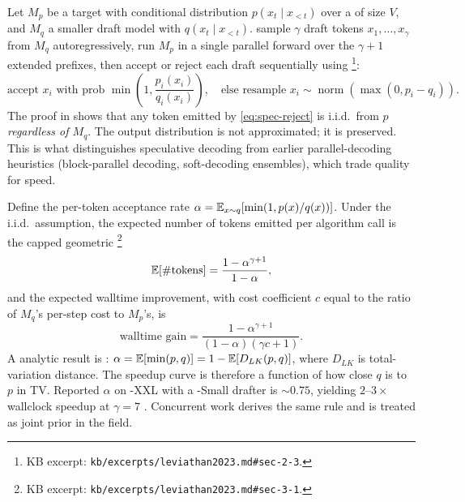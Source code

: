 Let $M_p$ be a target  with conditional distribution $p(x_t \mid
x_{<t})$ over a  of size $V$, and $M_q$ a smaller draft
model with $q(x_t \mid x_{<t})$. \citet{leviathan2023} sample $\gamma$
draft tokens $x_1, \ldots, x_\gamma$ from $M_q$ autoregressively, run
$M_p$ in a single parallel forward over the $\gamma + 1$ extended
prefixes, then accept or reject each draft sequentially using
\citep[\S 2.3]{leviathan2023}\footnote{KB excerpt:
\texttt{kb/excerpts/leviathan2023.md\#sec-2-3}.}:
\begin{equation}
\text{accept } x_i \text{ with prob } \min\!\left(1, \frac{p_i(x_i)}{q_i(x_i)}\right),
\quad \text{else resample } x_i \sim \operatorname{norm}(\max(0, p_i - q_i)).
\label{eq:spec-reject}
\end{equation}
The proof in \citet[App.~A.1]{leviathan2023} shows that any token
emitted by \cref{eq:spec-reject} is i.i.d.\ from $p$ \emph{regardless
of $M_q$}. The output distribution is not approximated; it is
preserved. This is what distinguishes speculative decoding from earlier
parallel-decoding heuristics (block-parallel decoding, soft-decoding
ensembles), which trade quality for speed.

Define the per-token acceptance rate
$\alpha = \operatorname{\mathbb{E}}_{x \sim q}[\min(1, p(x)/q(x))]$. Under the i.i.d.\
assumption, the expected number of tokens emitted per algorithm call
is the capped geometric \citep[\S 3.1, Eq.~1]{leviathan2023}\footnote{KB
excerpt: \texttt{kb/excerpts/leviathan2023.md\#sec-3-1}.}
\begin{equation}
\operatorname{\mathbb{E}}[\#\text{tokens}] = \frac{1 - \alpha^{\gamma+1}}{1 - \alpha},
\label{eq:spec-tokens}
\end{equation}
and the expected walltime improvement, with cost coefficient $c$ equal
to the ratio of $M_q$'s per-step cost to $M_p$'s, is
\citep[\S 3.3, Thm.~3.8]{leviathan2023}
\begin{equation}
\text{walltime gain} = \frac{1 - \alpha^{\gamma+1}}{(1-\alpha)(\gamma c + 1)}.
\label{eq:spec-walltime}
\end{equation}
A  analytic result is \citet[Thm.~3.5, Cor.~3.6]{leviathan2023}:
$\alpha = \operatorname{\mathbb{E}}[\min(p, q)] = 1 - \operatorname{\mathbb{E}}[D_{LK}(p, q)]$, where $D_{LK}$ is
total-variation distance. The speedup curve is therefore a function of
how close $q$ is to $p$ in TV. Reported $\alpha$ on -XXL with a
\glsterm{t5}{T5}-Small drafter is $\sim 0.75$, yielding $2$--$3\times$ wallclock
speedup at $\gamma = 7$ \citep[\S 3.6, Tab.~3]{leviathan2023}.
Concurrent work \citep{chen2023-speculative} derives the same rule
and is treated as joint prior in the field.

